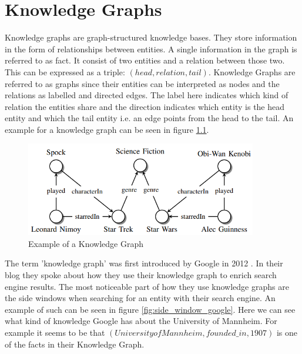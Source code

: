 \chapter{Knowledge Graphs}
\label{cha:knowledge_graphs}

Knowledge graphs are graph-structured knowledge bases. They store information in the form of relationships between entities. A single information in the graph is referred to as fact. It consist of two entities and a relation between those two. This can be expressed as a triple: $(head, relation, tail)$. Knowledge Graphs are referred to as graphs since their entities can be interpreted as nodes and the relations as labelled and directed edges. The label here indicates which kind of relation the entities share and the direction indicates which entity is the head entity and which the tail entity i.e. an edge points from the head to the tail. An example for a knowledge graph can be seen in figure \ref{fig:example_kg}. \cite{nickel_review_2016}

\begin{figure}[H]
\centering
\includegraphics[width=0.9\textwidth]{images/example_kg.png}
\caption{Example of a Knowledge Graph}
\label{fig:example_kg}
\end{figure}

The term 'knowledge graph' was first introduced by Google in 2012 \cite{singhal_introducing_2012}. In their blog they spoke about how they use their knowledge graph to enrich search engine results. The most noticeable part of how they use knowledge graphs are the side windows when searching for an entity with their search engine. An example of such can be seen in figure \ref{fig:side_window_google}. Here we can see what kind of knowledge Google has about the University of Mannheim. For example it seems to be that $(University of Mannheim, founded\_in, 1907)$ is one of the facts in their Knowledge Graph.

